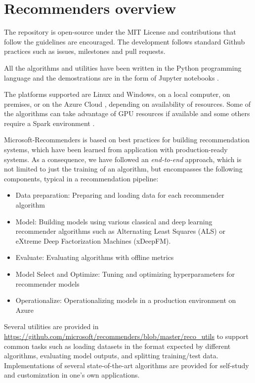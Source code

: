 \section{Recommenders overview}

The repository is open-source under the MIT License and contributions that follow the guidelines are encouraged.  
The development follows standard Github practices such as issues, milestones and pull requests.

All the algorithms and utilities have been written in the Python programming language and the demostrations are 
in the form of Jupyter notebooks \cite{jupyter}.

The platforms supported are Linux and Windows, on a local computer, on premises, or on the Azure Cloud \cite{azure}, depending on availability of resources.
Some of the algorithms can take advantage of GPU resources if available and some others require a Spark environment \cite{spark}.



Microsoft-Recommenders is based on best practices for building recommendation systems, which have been learned from application with production-ready systems.
As a consequence, we have followed an {\em end-to-end} approach, which is not limited to just the training of an algorithm, but encompasses the following components, typical in a recommendation pipeline:

\begin{itemize}
\item Data preparation: Preparing and loading data for each recommender algorithm
\item Model: Building models using various classical and deep learning recommender algorithms such as Alternating Least Squares (ALS) or eXtreme Deep Factorization Machines (xDeepFM).
\item Evaluate: Evaluating algorithms with offline metrics
\item Model Select and Optimize: Tuning and optimizing hyperparameters for recommender models
\item Operationalize: Operationalizing models in a production environment on Azure
\end{itemize}

Several utilities are provided in \url{https://github.com/microsoft/recommenders/blob/master/reco_utils} to support common tasks such as loading datasets in the format expected by different algorithms, evaluating model outputs, and splitting training/test data. Implementations of several state-of-the-art algorithms are provided for self-study and customization in one's own applications.

